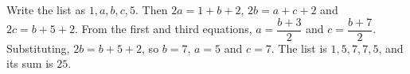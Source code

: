 Write the list as $1,a,b,c,5$. Then $2a=1+b+2$, $2b=a+c+2$ and $2c=b+5+2$. From the first and third equations, $a=\dfrac{b+3}2$ and $c=\dfrac{b+7}2$. Substituting, $2b=b+5+2$, so $b=7$, $a=5$ and $c=7$. The list is $1,5,7,7,5$, and its sum is $\boxed{25}$.
